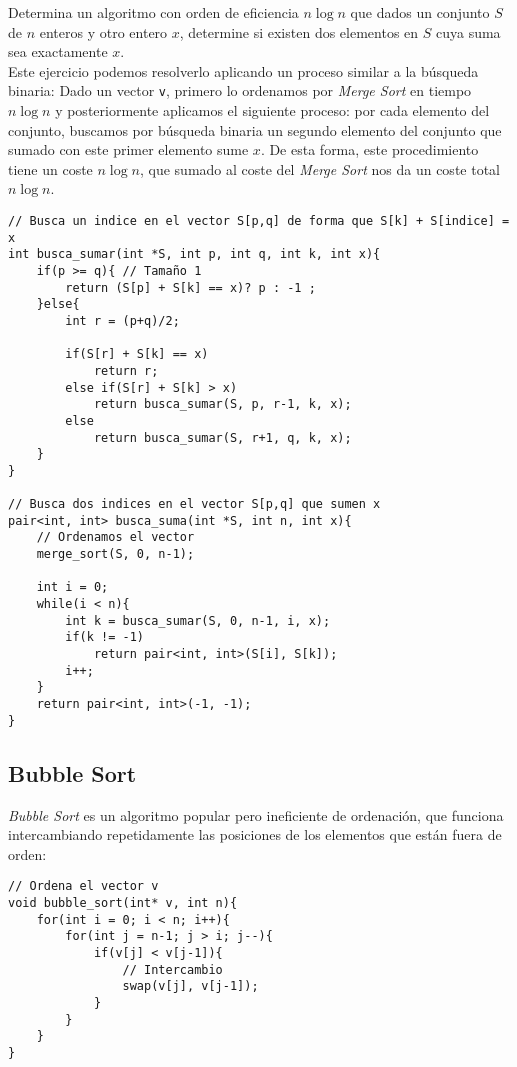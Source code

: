 \begin{ejercicio}
    Determina un algoritmo con orden de eficiencia $n\log n$ que dados un conjunto $S$ de $n$ enteros y otro entero $x$, determine si existen dos elementos en $S$ cuya suma sea exactamente $x$.\\

    \noindent
    Este ejercicio podemos resolverlo aplicando un proceso similar a la búsqueda binaria: Dado un vector \texttt{v}, primero lo ordenamos por \textit{Merge Sort} en tiempo $n\log n$ y posteriormente aplicamos el siguiente proceso: por cada elemento del conjunto, buscamos por búsqueda binaria un segundo elemento del conjunto que sumado con este primer elemento sume $x$. De esta forma, este procedimiento tiene un coste $n\log n$, que sumado al coste del \textit{Merge Sort} nos da un coste total $n\log n$.
    \begin{verbatim}
// Busca un indice en el vector S[p,q] de forma que S[k] + S[indice] = x
int busca_sumar(int *S, int p, int q, int k, int x){
    if(p >= q){ // Tamaño 1
        return (S[p] + S[k] == x)? p : -1 ;
    }else{
        int r = (p+q)/2;

        if(S[r] + S[k] == x)
            return r;
        else if(S[r] + S[k] > x)
            return busca_sumar(S, p, r-1, k, x);
        else
            return busca_sumar(S, r+1, q, k, x);
    }
}

// Busca dos indices en el vector S[p,q] que sumen x
pair<int, int> busca_suma(int *S, int n, int x){
    // Ordenamos el vector
    merge_sort(S, 0, n-1);

    int i = 0;
    while(i < n){
        int k = busca_sumar(S, 0, n-1, i, x);
        if(k != -1)
            return pair<int, int>(S[i], S[k]);
        i++;
    }
    return pair<int, int>(-1, -1);
}
    \end{verbatim}
\end{ejercicio}

\subsection{Bubble Sort}
\textit{Bubble Sort} es un algoritmo popular pero ineficiente de ordenación, que funciona intercambiando repetidamente las posiciones de los elementos que están fuera de orden:
\begin{verbatim}
// Ordena el vector v
void bubble_sort(int* v, int n){
    for(int i = 0; i < n; i++){
        for(int j = n-1; j > i; j--){
            if(v[j] < v[j-1]){
                // Intercambio
                swap(v[j], v[j-1]);
            }
        }
    }
}
\end{verbatim}

